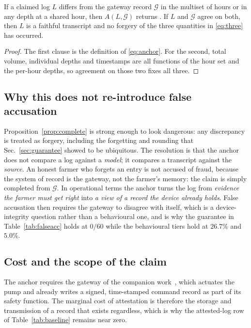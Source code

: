 \begin{proposition}
\label{prop:complete}
If a claimed log $L$ differs from the gateway record $\mathcal{G}$ in the
multiset of hours or in any depth at a shared hour, then $A(L,\mathcal{G})$
returns . If $L$ and $\mathcal{G}$ agree on both, then $L$ is a
faithful transcript and no forgery of the three quantities in \eqref{eq:three}
has occurred.
\end{proposition}

\begin{proof}
The first clause is the definition of \eqref{eq:anchor}. For the second, total
volume, individual depths and timestamps are all functions of the hour set and
the per-hour depths, so agreement on those two fixes all three.
\end{proof}

\subsection{Why this does not re-introduce false accusation}

Proposition~\ref{prop:complete} is strong enough to look dangerous: any
discrepancy is treated as forgery, including the forgetting and rounding that
Sec.~\ref{sec:guarantee} showed to be ubiquitous. The resolution is that the
anchor does not compare a log against a \emph{model}; it compares a transcript
against the \emph{source}. An honest farmer who forgets an entry is not accused
of fraud, because the system of record is the gateway, not the farmer's memory:
the claim is simply completed from $\mathcal{G}$. In operational terms the anchor
turns the log from \emph{evidence the farmer must get right} into \emph{a view of
a record the device already holds}. False accusation then requires the gateway to
disagree with itself, which is a device-integrity question rather than a
behavioural one, and is why the guarantee in Table~\ref{tab:falseacc} holds at
$0/60$ while the behavioural tiers hold at $26.7\%$ and $5.0\%$.

\subsection{Cost and the scope of the claim}

The anchor requires the gateway of the companion work~\cite{twingate2026}, which
actuates the pump and already writes a signed, time-stamped command record as
part of its safety function. The marginal cost of attestation is therefore the
storage and transmission of a record that exists regardless, which is why the
attested-log row of Table~\ref{tab:baseline} remains near zero.

